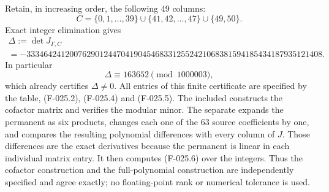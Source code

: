 Retain, in increasing order, the following 49 columns:
\[
              C=\{0,1,\ldots,39\}\cup\{41,42,\ldots,47\}
                                  \cup\{49,50\}.
                                                               \tag{F-025.5}
\]
Exact integer elimination gives
\[
 \begin{gathered}
 \Delta:=\det J_{\Gamma,C}\\
 =-333464241200762901244704190454683312552421068381594185434187935121408.
 \end{gathered}
                                                               \tag{F-025.6}
\]
In particular
\[
                         \Delta\equiv163652\pmod{1000003},
                                                               \tag{F-025.7}
\]
which already certifies \(\Delta\ne0\).
All entries of this finite certificate are specified by the
table, (F-025.2), (F-025.4) and (F-025.5). The included
constructs the cofactor matrix and verifies the modular minor.
The separate
expands the permanent as six products, changes each one of
the 63 source coefficients by one, and compares the resulting
polynomial differences with every column of \(J\).
Those differences are the exact derivatives because the
permanent is linear in each individual matrix entry.
It then computes (F-025.6) over the integers. Thus the
cofactor construction and the full-polynomial construction
are independently specified and agree exactly; no floating-point
rank or numerical tolerance is used.


